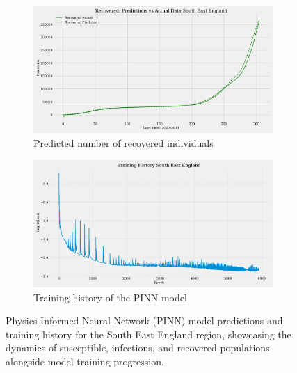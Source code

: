\documentclass[12pt]{article}
\begin{document}
\begin{figure}
    \begin{subfigure}[t]{0.45\textwidth}
        \includegraphics[width=\textwidth]{images/pinn/R_predictions_South East England.pdf}
        \caption{Predicted number of recovered individuals}
        \label{fig:R_predictions_South East England}
    \end{subfigure}
    \hfill %
    \begin{subfigure}[t]{0.45\textwidth}
        \centering
        \includegraphics[width=\textwidth]{images/pinn/Training_History_South East England.pdf}
        \caption{Training history of the PINN model}
        \label{fig:Training_History_South East England}
    \end{subfigure}
    \caption{Physics-Informed Neural Network (PINN) model predictions and training history for the South East England region, showcasing the dynamics of susceptible, infectious, and recovered populations alongside model training progression.}
    \label{fig:PINN_South East England_Comprehensive}

\end{figure}
\end{document}
